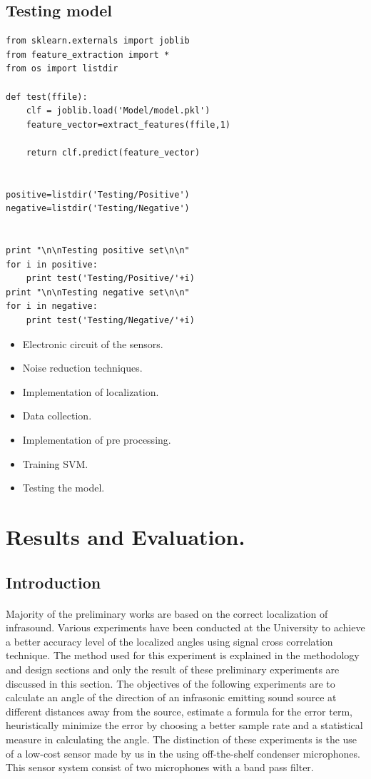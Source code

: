 \documentclass[12pt]{article}
\numberwithin{figure}{section}
\numberwithin{table}{section}
\begin{document}
\subsection{Testing model}
\begin{lstlisting}
from sklearn.externals import joblib
from feature_extraction import *
from os import listdir

def test(ffile):
    clf = joblib.load('Model/model.pkl')
    feature_vector=extract_features(ffile,1)
    
    return clf.predict(feature_vector)


positive=listdir('Testing/Positive')
negative=listdir('Testing/Negative')


print "\n\nTesting positive set\n\n"
for i in positive:
    print test('Testing/Positive/'+i)
print "\n\nTesting negative set\n\n"
for i in negative:
    print test('Testing/Negative/'+i)
\end{lstlisting}

\begin{itemize}
  \item Electronic circuit of the sensors.
  \item Noise reduction techniques.
  \item Implementation of localization.
  \item Data collection.
  \item Implementation of pre processing.
  \item Training SVM.
  \item Testing the model.
\end{itemize}

\newpage
\section{Results and Evaluation.}
\subsection{Introduction}
\paragraph{}
Majority of the preliminary works are based on the correct localization of infrasound. Various experiments have been conducted at the University to achieve a better accuracy level of the localized angles using signal cross correlation technique. The method used for this experiment is explained in the methodology and design sections and only the result of these preliminary experiments are discussed in this section. The objectives of the following experiments are to calculate an angle of the direction of an infrasonic emitting sound source at different distances away from the source, estimate a formula for the error term, heuristically minimize the error by choosing a better sample rate and a statistical measure in calculating the angle. The distinction of these experiments is the use of a low-cost sensor made by us in the using off-the-shelf condenser microphones. This sensor  system consist of two microphones with a band pass filter.
\end{document}
